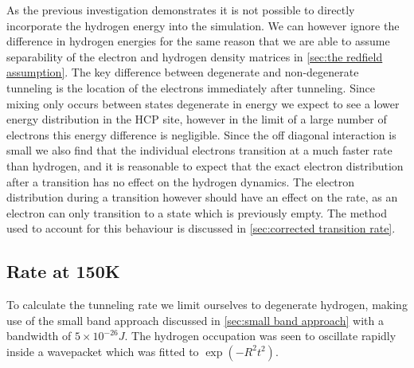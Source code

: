 
As the previous investigation
demonstrates it is
not possible to directly
incorporate the hydrogen energy
into the simulation.
We can however ignore the
difference in hydrogen energies
for the same reason that
we are able to assume separability
of the electron and hydrogen
density matrices in
\cref{sec:the redfield assumption}.
The key difference
between degenerate and
non-degenerate tunneling
is the location of the
electrons
immediately after
tunneling. Since
mixing only occurs
between states degenerate
in energy we expect
to see a lower energy
distribution in the
HCP site, however
in the
limit of a large
number of electrons
this energy
difference is negligible.
Since the off diagonal
interaction is small
we also find that the
individual electrons
transition at a much
faster rate than
hydrogen, and it is
reasonable
to expect that
the exact electron
distribution after a
transition has no effect
on the hydrogen dynamics.
The electron distribution
during a transition however
should have an effect on the
rate, as an electron can
only transition to a state
which is previously
empty. The method used to
account for this behaviour
is discussed in
\cref{sec:corrected transition rate}.

\subsection{Rate at 150K}\label{sec:degenerate tunnelling simulaton}
To calculate the tunneling rate
we limit
ourselves to degenerate
hydrogen, making use of
the small band approach
discussed in \cref{sec:small band approach}
with a bandwidth of
\(5\times{}10^{-26}J\).
The hydrogen occupation
was seen to oscillate
rapidly inside a wavepacket
which was fitted to
\(\exp{(- R^2t^2)}\).

